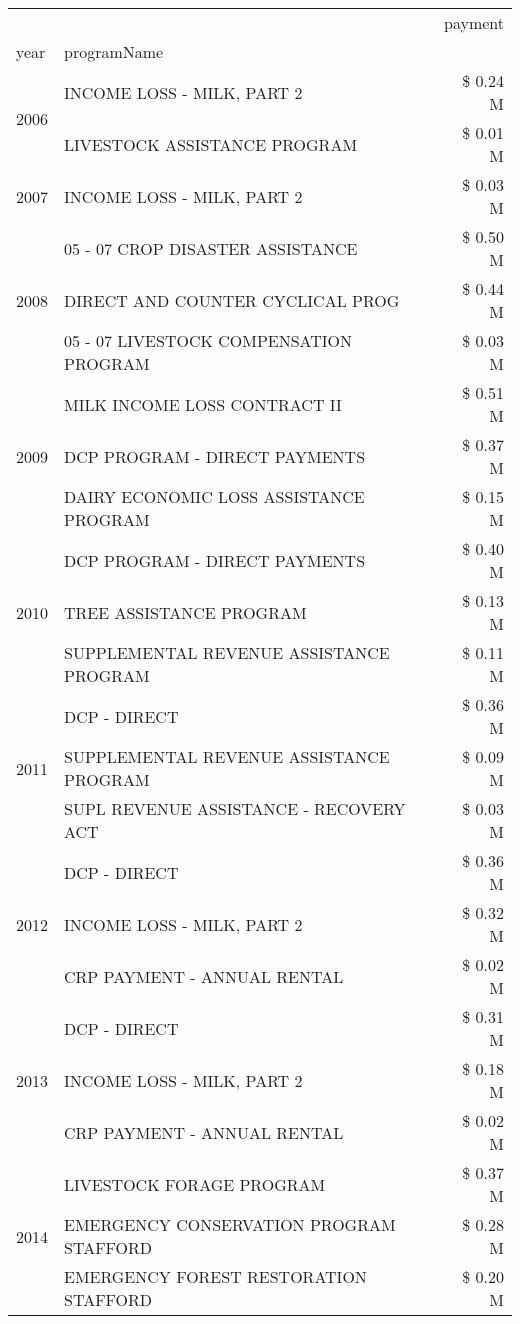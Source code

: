 \begin{tabular}{llr}
\toprule
 &  & payment \\
year & programName &  \\
\midrule
\multirow[t]{2}{*}{2006} & INCOME LOSS - MILK, PART 2 & \$ 0.24 M \\
 & LIVESTOCK ASSISTANCE PROGRAM & \$ 0.01 M \\
\cline{1-3}
2007 & INCOME LOSS - MILK, PART 2 & \$ 0.03 M \\
\cline{1-3}
\multirow[t]{3}{*}{2008} & 05 - 07 CROP DISASTER ASSISTANCE & \$ 0.50 M \\
 & DIRECT AND COUNTER CYCLICAL PROG & \$ 0.44 M \\
 & 05 - 07 LIVESTOCK COMPENSATION PROGRAM & \$ 0.03 M \\
\cline{1-3}
\multirow[t]{3}{*}{2009} & MILK INCOME LOSS CONTRACT II & \$ 0.51 M \\
 & DCP PROGRAM - DIRECT PAYMENTS & \$ 0.37 M \\
 & DAIRY ECONOMIC LOSS ASSISTANCE PROGRAM & \$ 0.15 M \\
\cline{1-3}
\multirow[t]{3}{*}{2010} & DCP PROGRAM - DIRECT PAYMENTS & \$ 0.40 M \\
 & TREE ASSISTANCE PROGRAM & \$ 0.13 M \\
 & SUPPLEMENTAL REVENUE ASSISTANCE PROGRAM & \$ 0.11 M \\
\cline{1-3}
\multirow[t]{3}{*}{2011} & DCP - DIRECT & \$ 0.36 M \\
 & SUPPLEMENTAL REVENUE ASSISTANCE PROGRAM & \$ 0.09 M \\
 & SUPL REVENUE ASSISTANCE - RECOVERY ACT & \$ 0.03 M \\
\cline{1-3}
\multirow[t]{3}{*}{2012} & DCP - DIRECT & \$ 0.36 M \\
 & INCOME LOSS - MILK, PART 2 & \$ 0.32 M \\
 & CRP PAYMENT - ANNUAL RENTAL & \$ 0.02 M \\
\cline{1-3}
\multirow[t]{3}{*}{2013} & DCP - DIRECT & \$ 0.31 M \\
 & INCOME LOSS - MILK, PART 2 & \$ 0.18 M \\
 & CRP PAYMENT - ANNUAL RENTAL & \$ 0.02 M \\
\cline{1-3}
\multirow[t]{3}{*}{2014} & LIVESTOCK FORAGE PROGRAM & \$ 0.37 M \\
 & EMERGENCY CONSERVATION PROGRAM STAFFORD & \$ 0.28 M \\
 & EMERGENCY FOREST RESTORATION STAFFORD & \$ 0.20 M \\
\cline{1-3}

\end{tabular}
